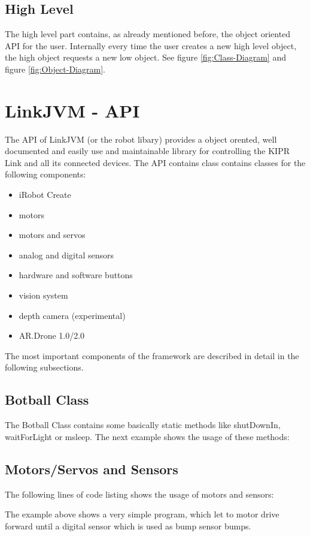 \documentclass{juniorjournal}
\begin{document}
\subsection{High Level}
The high level part contains, as already mentioned before, the object oriented API for the user. 
Internally every time the user creates a new high level object, the high object requests a new low object.
See figure \ref{fig:Class-Diagram} and figure \ref{fig:Object-Diagram}.

\section{LinkJVM - API}
The API of LinkJVM (or the robot libary) provides a object orented, well documented and easily use and maintainable library for controlling the KIPR Link and all its connected devices.
The API contains class contains classes for the following components:
\begin{itemize}
	\item iRobot Create
	\item motors
	\item motors and servos
	\item analog and digital sensors
	\item hardware and software buttons
	\item vision system
	\item depth camera (experimental)
	\item AR.Drone 1.0/2.0
\end{itemize}
The most important components of the framework are described in detail in the following subsections.

\subsection{Botball Class}
The Botball\cite{Botball} Class contains some basically static methods like shutDownIn, 
waitForLight or msleep.
The next example shows the usage of these methods:


\subsection{Motors/Servos and Sensors}
The following lines of code listing shows the usage of motors and sensors:

The example above shows a very simple program, which let to motor drive forward 
until a digital sensor which is used as bump sensor bumps.
\end{document}
